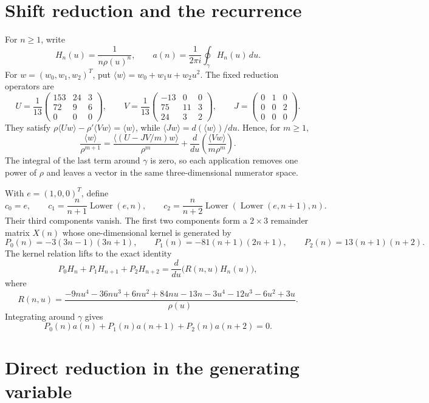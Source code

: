 \documentclass[11pt,fleqn]{article}
\theoremstyle{plain}
\newcommand{\poly}[1]{\langle #1\rangle}
\newcommand{\dd}{\,d}
\begin{document}
\clearpage
\section{Shift reduction and the recurrence}

For $n\ge1$, write
\[
H_n(u)=\frac1{n\rho(u)^n},\qquad
 a(n)=\frac{1}{2\pi i}\oint_\gamma H_n(u)\dd u.
\]
For $w=(w_0,w_1,w_2)^T$, put $\poly{w}=w_0+w_1u+w_2u^2$.  The
fixed reduction operators are
\[
U=\frac1{13}
\begin{pmatrix}
153&24&3\\72&9&6\\0&0&0
\end{pmatrix},\qquad
V=\frac1{13}
\begin{pmatrix}
-13&0&0\\75&11&3\\24&3&2
\end{pmatrix},\qquad
J=\begin{pmatrix}0&1&0\\0&0&2\\0&0&0\end{pmatrix}.
\]
They satisfy $\rho\poly{Uw}-\rho'\poly{Vw}=\poly{w}$, while
$\poly{Jw}=d(\poly{w})/du$.  Hence, for $m\ge1$,
\[
\frac{\poly{w}}{\rho^{m+1}}
=
\frac{\poly{(U-JV/m)w}}{\rho^m}
+\frac{d}{du}\left(\frac{\poly{Vw}}{m\rho^m}\right).
\]
The integral of the last term around $\gamma$ is zero, so each application
removes one power of $\rho$ and leaves a vector in the same
three-dimensional numerator space.

With $e=(1,0,0)^T$, define
\[
c_0=e,\qquad
c_1=\frac{n}{n+1}\operatorname{Lower}(e,n),\qquad
c_2=\frac{n}{n+2}\operatorname{Lower}
   (\operatorname{Lower}(e,n+1),n).
\]
Their third components vanish.  The first two components form a $2\times3$
remainder matrix $X(n)$ whose one-dimensional kernel is generated by
\[
P_0(n)=-3(3n-1)(3n+1),\qquad
P_1(n)=-81(n+1)(2n+1),\qquad
P_2(n)=13(n+1)(n+2).
\]
The kernel relation lifts to the exact identity
\[
P_0H_n+P_1H_{n+1}+P_2H_{n+2}
=\frac{d}{du}\bigl(R(n,u)H_n(u)\bigr),
\]
where
\[
R(n,u)=
\frac{-9nu^4-36nu^3+6nu^2+84nu-13n-3u^4-12u^3-6u^2+3u}{\rho(u)}.
\]
Integrating around $\gamma$ gives
\[
P_0(n)a(n)+P_1(n)a(n+1)+P_2(n)a(n+2)=0.
\]

\clearpage
\section{Direct reduction in the generating variable}
\end{document}
